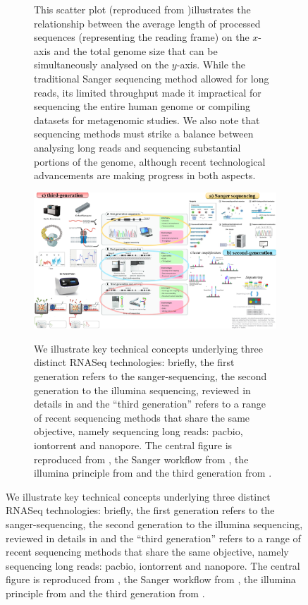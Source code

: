 {{\begin{figure}
\begin{subfigure}[p]{0.55\textwidth}
         \label{subfig:plot-ngs}
         \caption[\textbf{Comparison of Sequencing methods}]{This scatter plot (reproduced from \autocite[Fig. 1]{dr_samanthi17})illustrates the relationship between the average length of processed sequences (representing the reading frame) on the $x$-axis and the total genome size that can be simultaneously analysed on the $y$-axis. While the traditional Sanger sequencing method allowed for long reads, its limited throughput made it impractical for sequencing the entire human genome or compiling datasets for metagenomic studies. We also note that sequencing methods must strike a balance between analysing long reads and sequencing substantial portions of the genome, although recent technological advancements are making progress in both aspects.}
     \end{subfigure}
     \vfill
     \begin{subfigure}[p]{0.95\textwidth}
         \centering
         \includegraphics[width=\textwidth]{figures/biological_introduction/detailled_rnaseq_technologies.png}
         \label{subfig:detailled-techniques}
         \caption[RNASeq generations]{We illustrate key technical concepts underlying three distinct RNASeq technologies: briefly, 
		 the first generation refers to the \gls{sanger-sequencing}, the second generation to the \Gls{illumina} sequencing, reviewed in details in  and the \enquote{third generation} refers to a range of recent sequencing methods that share the same objective, namely sequencing long reads: \gls{pacbio}, \gls{iontorrent} and \gls{nanopore}. The central figure is reproduced from \autocite[Fig .3]{debruijn_etal21}, the Sanger workflow from \autocite[Fig .1]{shrestha22}, the \Gls{illumina} principle from \autocite{dmlapato23} and the third generation from \autocite[Fig. 1]{stark_etal19}.}
     \end{subfigure}

\end{figure}}}
